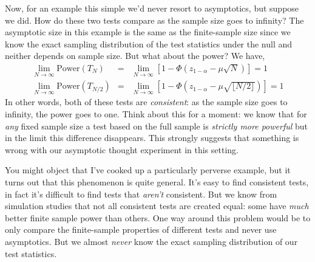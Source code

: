 \documentclass[12pt]{article}
\theoremstyle{definition}
\begin{document}
Now, for an example this simple we'd never resort to asymptotics, but suppose we did. How do these two tests compare as the sample size goes to infinity? The asymptotic size in this example is the same as the finite-sample size since we know the exact sampling distribution of the test statistics under the null and neither depends on sample size. But what about the power? We have,
\begin{eqnarray*}
\lim_{N\rightarrow \infty} \mbox{Power}(T_{N}) &=& \lim_{N\rightarrow \infty}\left[1 - \Phi\left(z_{1-\alpha} - \mu\sqrt{N}\right) \right] = 1\\
\lim_{N\rightarrow \infty} \mbox{Power}(T_{N/2}) &=& \lim_{N\rightarrow \infty}\left[1 - \Phi\left(z_{1-\alpha} - \mu\sqrt{\lfloor N/2 \rfloor }\right) \right] = 1
\end{eqnarray*}
In other words, both of these tests are \emph{consistent}: as the sample size goes to infinity, the power goes to one. Think about this for a moment: we know that for \emph{any} fixed sample size a test based on the full sample is \emph{strictly more powerful} but in the limit this difference disappears. This strongly suggests that something is wrong with our asymptotic thought experiment in this setting.

You might object that I've cooked up a particularly perverse example, but it turns out that this phenomenon is quite general. It's easy to find consistent tests, in fact it's difficult to find tests that \emph{aren't} consistent. But we know from simulation studies that not all consistent tests are created equal: some have \emph{much} better finite sample power than others. One way around this problem would be to only compare the finite-sample properties of different tests and never use asymptotics. But we almost \emph{never} know the exact sampling distribution of our test statistics.
\end{document}
